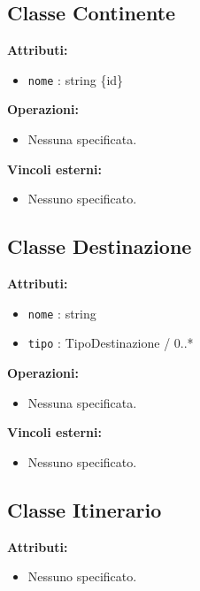 \documentclass[a4paper]{scrartcl}
\begin{document}
\subsection{Classe Continente}

\textbf{Attributi:}
\begin{itemize}
    \item \texttt{nome} : string \{id\}
\end{itemize}

\textbf{Operazioni:}
\begin{itemize}
    \item Nessuna specificata.
\end{itemize}

\textbf{Vincoli esterni:}
\begin{itemize}
    \item Nessuno specificato.
\end{itemize}

\subsection{Classe Destinazione}

\textbf{Attributi:}
\begin{itemize}
    \item \texttt{nome} : string
    \item \texttt{tipo} : TipoDestinazione / 0..*
\end{itemize}

\textbf{Operazioni:}
\begin{itemize}
    \item Nessuna specificata.
\end{itemize}

\textbf{Vincoli esterni:}
\begin{itemize}
    \item Nessuno specificato.
\end{itemize}

\subsection{Classe Itinerario}

\textbf{Attributi:}
\begin{itemize}
    \item Nessuno specificato.
\end{itemize}
\end{document}
